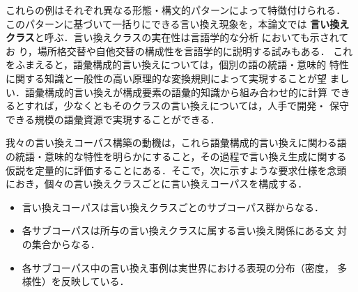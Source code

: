 
これらの例はそれぞれ異なる形態・構文的パターンによって特徴付けられる．
このパターンに基づいて一括りにできる言い換え現象を，本論文では
\textbf{言い換えクラス}と呼ぶ．言い換えクラスの実在性は言語学的な分析
\cite{melcuk:87,jackendoff:90,levin:93,kageyama:01}においても示されてお
り，場所格交替や自他交替の構成性を言語学的に説明する試みもある．
これをふまえると，語彙構成的言い換えについては，個別の語の統語・意味的
特性に関する知識と一般性の高い原理的な変換規則によって実現することが望
ましい．語彙構成的言い換えが構成要素の語彙的知識から組み合わせ的に計算
できるとすれば，少なくともそのクラスの言い換えについては，人手で開発・
保守できる規模の語彙資源で実現することができる．

我々の言い換えコーパス構築の動機は，これら語彙構成的言い換えに関わる語
の統語・意味的な特性を明らかにすること，その過程で言い換え生成に関する
仮説を定量的に評価することにある．そこで，次に示すような要求仕様を念頭
におき，個々の言い換えクラスごとに言い換えコーパスを構成する．
\begin{itemize}
\item 言い換えコーパスは言い換えクラスごとのサブコーパス群からなる．
\item 各サブコーパスは所与の言い換えクラスに属する言い換え関係にある文
  対の集合からなる．
\item 各サブコーパス中の言い換え事例は実世界における表現の分布（密度，
  多様性）を反映している．
\end{itemize}

